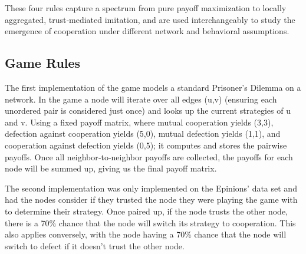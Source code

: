 \medskip
These four rules capture a spectrum from pure payoff maximization to locally aggregated, trust‐mediated imitation, and are used interchangeably to study the emergence of cooperation under different network and behavioral assumptions. 
\subsection{Game Rules}
The first implementation of the game models a standard Prisoner's Dilemma on a network. In the game a node will iterate over all edges (u,v) (ensuring each unordered pair is considered just once) and looks up the current strategies of u and v. Using a fixed payoff matrix, where mutual cooperation yields (3,3), defection against cooperation yields (5,0), mutual defection yields (1,1), and cooperation against defection yields (0,5); it computes and stores the pairwise payoffs. Once all neighbor‐to‐neighbor payoffs are collected, the payoffs for each node will be summed up, giving us the final payoff matrix.

The second implementation was only implemented on the Epinions' data set and had the nodes consider if they trusted the node they were playing the game with to determine their strategy. Once paired up, if the node trusts the other node, there is a 70\% chance that the node will switch its strategy to cooperation. This also applies conversely, with the node having a 70\% chance that the node will switch to defect if it doesn't trust the other node. 
